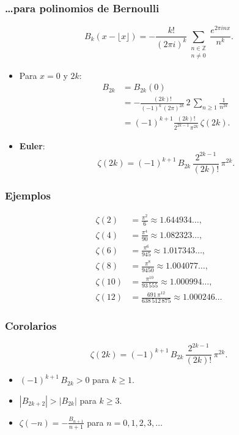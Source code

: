 \documentclass{beamer}
\begin{document}

\begin{frame}
  \frametitle{\dots{}para polinomios de Bernoulli}

  \[ B_k (x - \lfloor x\rfloor) = -\frac{k!}{(2\pi i)^k}\sum_{\substack{n\in \mathbb{Z} \\ n \ne 0}} \frac{e^{2\pi i n x}}{n^k}. \]

  \begin{itemize}
  \item<2-> Para $x = 0$ y $2k$:
    \begin{align*}
      B_{2k} & = B_{2k} (0) \\
      & = -\frac{(2k)!}{(-1)^k\,(2\pi)^{2k}} \, 2\,\sum_{n \ge 1} \frac{1}{n^{2k}} \\
      & = (-1)^{k+1}\frac{(2k)!}{2^{2k-1}\,\pi^{2k}}\,\zeta (2k).
    \end{align*}

  \item<3-> \textbf{Euler}:
    $$\zeta (2k) = (-1)^{k+1} \, B_{2k}\,\frac{2^{2k-1}}{(2k)!}\,\pi^{2k}.$$
  \end{itemize}
\end{frame}


\begin{frame}
  \frametitle{Ejemplos}

  \begin{align*}
    \zeta (2) & = \frac{\pi^2}{6} \approx 1.644934\ldots, \\
    \zeta (4) & = \frac{\pi^4}{90} \approx 1.082323\ldots, \\
    \zeta (6) & = \frac{\pi^6}{945}  \approx 1.017343\ldots, \\
    \zeta (8) & = \frac{\pi^8}{9450} \approx 1.004077\ldots, \\
    \zeta (10) & = \frac{\pi^{10}}{93\,555} \approx 1.000994\ldots, \\
    \zeta (12) & = \frac{691\,\pi^{12}}{638\,512\,875} \approx 1.000246\ldots
  \end{align*}
\end{frame}


\begin{frame}
  \frametitle{Corolarios}

  \[ \zeta (2k) = (-1)^{k+1} \, B_{2k}\,\frac{2^{2k-1}}{(2k)!}\,\pi^{2k}. \]

  \begin{itemize}
  \item<2-> $(-1)^{k+1}\,B_{2k} > 0$ para $k \ge 1$.

  \item<3-> $|B_{2k+2}| > |B_{2k}|$ para $k \ge 3$.

  \item<4-> $\zeta (-n) = -\frac{B_{n+1}}{n+1}$ para $n = 0,1,2,3,\ldots$
  \end{itemize}
\end{frame}
\end{document}
